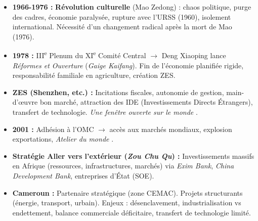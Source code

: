 \documentclass[11pt]{article}
\newcommand{\cle}[1]{{\popxbold\color{popdark}#1}}
\begin{document}
\begin{aretenir}
\begin{itemize}
    \item \textbf{1966-1976 :} \textbf{Révolution culturelle} (Mao Zedong) : chaos politique, purge des cadres, économie paralysée, rupture avec l'URSS (1960), isolement international. Nécessité d'un changement radical après la mort de Mao (1976).
    \item \textbf{1978 :} III\textsuperscript{e} Plenum du XI\textsuperscript{e} Comité Central $\rightarrow$ Deng Xiaoping lance \emph{Réformes et Ouverture} (\textit{Gaige Kaifang}). Fin de l'économie planifiée rigide, responsabilité familiale en agriculture, création ZES.
    \item \textbf{ZES (Shenzhen, etc.) :} \cle{Incitations fiscales}, autonomie de gestion, main-d'œuvre bon marché, attraction des \cle{IDE} (Investissements Directs Étrangers), transfert de technologie. \og \emph{Une fenêtre ouverte sur le monde} \fg.
    \item \textbf{2001 :} Adhésion à l'\cle{OMC} $\rightarrow$ accès aux marchés mondiaux, explosion exportations, \og \emph{Atelier du monde} \fg.
    \item \textbf{Stratégie \og Aller vers l'extérieur \fg (\textit{Zou Chu Qu}) :} Investissements massifs en Afrique (ressources, infrastructures, marchés) via \emph{Exim Bank}, \emph{China Development Bank}, entreprises d'État (SOE).
    \item \textbf{Cameroun :} Partenaire stratégique (zone CEMAC). Projets structurants (énergie, transport, urbain). Enjeux : désenclavement, industrialisation vs endettement, balance commerciale déficitaire, transfert de technologie limité.
\end{itemize}
\end{aretenir}
\end{document}
